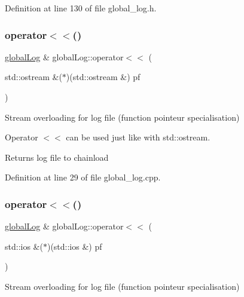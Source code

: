 Definition at line 130 of file global\+\_\+log.\+h.

\hypertarget{classglobal_log_a9fd368182e141dde5923ba8a6e559b3b}{}\label{classglobal_log_a9fd368182e141dde5923ba8a6e559b3b} 
\subsubsection{\texorpdfstring{operator$<$$<$()}{operator<<()}\hspace{0.1cm}{\footnotesize\ttfamily [2/4]}}
{\footnotesize\ttfamily \hyperlink{classglobal_log}{global\+Log} \& global\+Log\+::operator$<$$<$ (\begin{DoxyParamCaption}\item[{std\+::ostream \&($\ast$)(std\+::ostream \&)}]{pf }\end{DoxyParamCaption})}



Stream overloading for log file (function pointeur specialisation) 

Operator $<$$<$ can be used just like with std\+::ostream.

\begin{DoxyReturn}{Returns}
log file to chainload 
\end{DoxyReturn}


Definition at line 29 of file global\+\_\+log.\+cpp.

\hypertarget{classglobal_log_a8abfc695fe7cc6fd17112f5222482236}{}\label{classglobal_log_a8abfc695fe7cc6fd17112f5222482236} 
\subsubsection{\texorpdfstring{operator$<$$<$()}{operator<<()}\hspace{0.1cm}{\footnotesize\ttfamily [3/4]}}
{\footnotesize\ttfamily \hyperlink{classglobal_log}{global\+Log} \& global\+Log\+::operator$<$$<$ (\begin{DoxyParamCaption}\item[{std\+::ios \&($\ast$)(std\+::ios \&)}]{pf }\end{DoxyParamCaption})}



Stream overloading for log file (function pointeur specialisation) 

